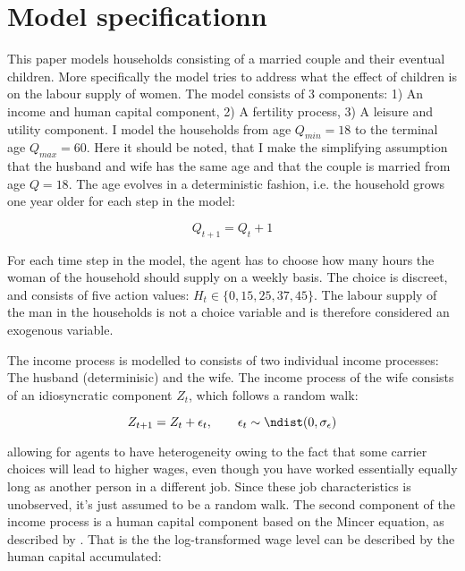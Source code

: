 \section{Model specificationn}\label{sec:model1}

This paper models households consisting of a married couple and their eventual children. More specifically the model tries to address what the effect of children is on the labour supply of women. The model consists of 3 components: 1) An income and human capital component, 2) A fertility process, 3) A leisure and utility component. I model the households from age $Q_{min}=18$ to the terminal age $Q_{max} = 60$. Here it should be noted, that I make the simplifying assumption that the husband and wife has the same age and that the couple is married from age $Q=18$. The age evolves in a deterministic fashion, i.e. the household grows one year older for each step in the model:

\begin{equation}
    Q_{t+1} = Q_t + 1
\end{equation}

For each time step in the model, the agent has to  choose how many hours the woman of the household should supply on a weekly basis. The choice is discreet, and consists of five action values: $H_t \in \{0, 15, 25, 37, 45 \}$. The labour supply of the man in the households is not a choice variable and is therefore considered an exogenous variable.

The income process is modelled to consists of two individual income processes: The husband (determinisic) and the wife. The income process of the wife consists of an idiosyncratic component $Z_t$, which follows a random walk:

\begin{equation}
    Z_{t+1} = Z_t + \epsilon_t, \qquad \epsilon_t \sim \ndist (0, \sigma_\epsilon)
\end{equation}

allowing for agents to have heterogeneity owing to the fact that some carrier choices will lead to higher wages, even though you have worked essentially equally long as another person in a different job. Since these job characteristics is unobserved, it's just assumed to be a random walk. The second component of the income process is a human capital component based on the Mincer equation, as described by \textcite{lemieux_mincer_2006}. That is the the log-transformed wage level can be described by the human capital accumulated:


